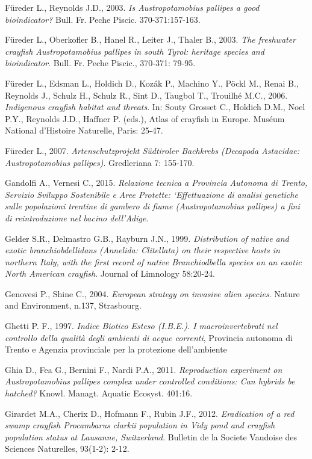 \documentclass[11pt,a4paper,italian,twoside,openany]{memoir}
\begin{document}
\begin{thebibliography}{9}
 Füreder L., Reynolds J.D., 2003. \emph{Is Austropotamobius pallipes a good bioindicator?} Bull. Fr. Peche Piscic. 370-371:157-163.

 Füreder L., Oberkofler B., Hanel R., Leiter J., Thaler B., 2003. \emph{The freshwater crayfish Austropotamobius pallipes in south Tyrol: heritage species and bioindicator}. Bull. Fr. Peche Piscic., 370-371: 79-95.

 Füreder L., Edsman L., Holdich D., Kozák P., Machino Y., Pöckl M., Renai B., Reynolds J., Schulz H., Schulz R., Sint D., Taugbol T., Trouilhé M.C., 2006. \emph{Indigenous crayfish habitat and threats}. In: Souty Grosset C., Holdich D.M., Noel P.Y., Reynolds J.D., Haffner P. (eds.), Atlas of crayfish in Europe. Muséum National d'Histoire Naturelle, Paris: 25-47. 

 Füreder L., 2007. \emph{Artenschutzprojekt Südtiroler Bachkrebs (Decapoda Astacidae: Austropotamobius pallipes)}. Gredleriana 7: 155-170.

 Gandolfi A., Vernesi C., 2015. \emph{Relazione tecnica a Provincia Autonoma di Trento, Servizio Sviluppo Sostenibile e Aree Protette: ‘Effettuazione di analisi genetiche sulle popolazioni trentine di gambero di fiume (Austropotamobius pallipes) a fini di reintroduzione nel bacino dell'Adige}.

 Gelder S.R., Delmastro G.B., Rayburn J.N., 1999. \emph{Distribution of native and exotic branchiobdellidans (Annelida: Clitellata) on their respective hosts in northern Italy, with the first record of native Branchiodbella species on an exotic North American crayfish}. Journal of Limnology 58:20-24.

 Genovesi P., Shine C., 2004. \emph{European strategy on invasive alien species}. Nature and Environment, n.137, Strasbourg.

 Ghetti P. F., 1997. \emph{Indice Biotico Esteso (I.B.E.). I macroinvertebrati nel 
controllo della qualità degli ambienti di acque correnti}, Provincia autonoma di Trento e Agenzia provinciale per la protezione dell'ambiente

 Ghia D., Fea G., Bernini F., Nardi P.A., 2011. \emph{Reproduction experiment on Austropotamobius pallipes complex under controlled conditions: Can hybrids be hatched?} Knowl. Managt. Aquatic Ecosyst. 401:16.

 Girardet M.A., Cherix D., Hofmann F., Rubin J.F., 2012. \emph{Eradication of a red swamp crayfish Procambarus clarkii population in Vidy pond and crayfish population status at Lausanne, Switzerland}. Bulletin de la Societe Vaudoise des Sciences Naturelles, 93(1-2): 2-12.


\end{thebibliography}
\end{document}
